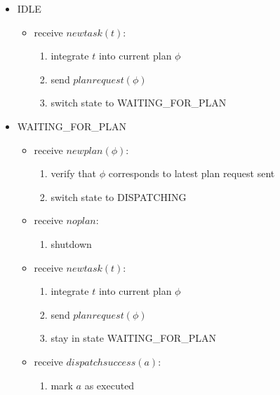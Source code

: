 \begin{itemize}
    \item IDLE
    \begin{itemize}
        \item receive $newtask(t)$:
        \begin{enumerate}
            \item integrate $t$ into current plan $\phi$
            \item send $planrequest(\phi)$
            \item switch state to WAITING\_FOR\_PLAN
        \end{enumerate}
    \end{itemize}
    \item WAITING\_FOR\_PLAN
    \begin{itemize}
        \item receive $newplan(\phi)$:
        \begin{enumerate}
            \item verify that $\phi$ corresponds to latest plan request sent
            \item switch state to DISPATCHING
        \end{enumerate}
        \item receive $noplan$:
        \begin{enumerate}
            \item shutdown
        \end{enumerate}
        \item receive $newtask(t)$:
        \begin{enumerate}
            \item integrate $t$ into current plan $\phi$
            \item send $planrequest(\phi)$
            \item stay in state WAITING\_FOR\_PLAN
        \end{enumerate}
        \item receive $dispatchsuccess(a)$:
        \begin{enumerate}
            \item mark $a$ as executed

\end{enumerate}
\end{itemize}
\end{itemize}
